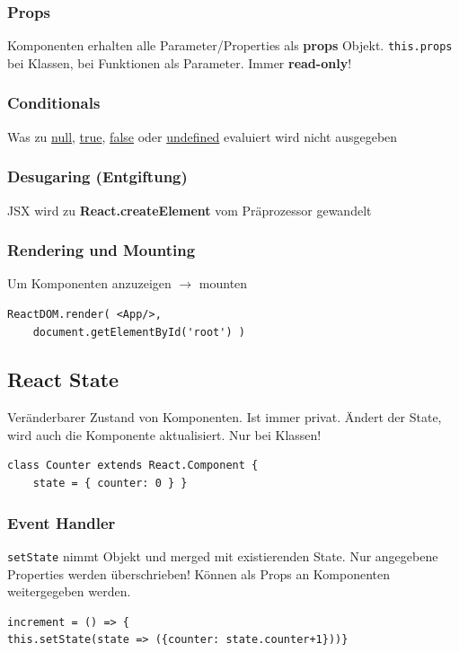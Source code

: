 \subsubsection{Props}
Komponenten erhalten alle Parameter/Properties als \textbf{props} Objekt.
\texttt{\tiny this.props} bei Klassen, bei Funktionen als Parameter. Immer \textbf{read-only}!

\subsubsection{Conditionals}
Was zu \underline{null}, \underline{true}, \underline{false} oder \underline{undefined} evaluiert wird nicht ausgegeben

\subsubsection{Desugaring (Entgiftung)}
JSX wird zu \textbf{React.createElement} vom Präprozessor gewandelt

\subsubsection{Rendering und Mounting}
Um Komponenten anzuzeigen $\rightarrow$ mounten

\begin{lstlisting}[style=JavaScript]
ReactDOM.render( <App/>,
    document.getElementById('root') )
\end{lstlisting}

\subsection{React State}
Veränderbarer Zustand von Komponenten. Ist immer privat. Ändert der State, wird auch die Komponente aktualisiert. Nur bei Klassen!
\begin{lstlisting}[style=JavaScript]
class Counter extends React.Component {
    state = { counter: 0 } }
\end{lstlisting}

\subsubsection{Event Handler}
\texttt{\tiny setState} nimmt Objekt und merged mit existierenden State. Nur angegebene Properties werden überschrieben! Können als Props an Komponenten weitergegeben werden.
\begin{lstlisting}[style=JavaScript]
increment = () => {
this.setState(state => ({counter: state.counter+1}))}
\end{lstlisting}

